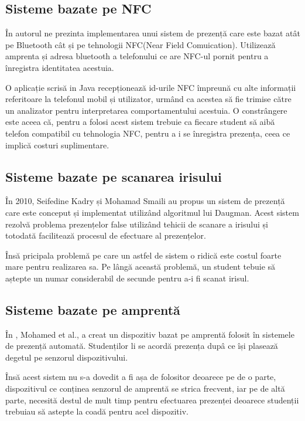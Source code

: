 \documentclass[a4paper, 12pt]{article}
\begin{document}
	
	\subsection{Sisteme bazate pe NFC}
	\bigskip
	\quad\space În \textbf{\cite{ahmad2014touchin}} autorul ne prezinta implementarea unui sistem de prezență care este bazat atât pe Bluetooth cât și pe tehnologii NFC(Near Field Comuication). Utilizează amprenta și adresa bluetooth a telefonului ce are NFC-ul pornit pentru a înregistra identitatea acestuia.
	
	O aplicație scrisă in Java \textbf{\cite{joy2000java}}  recepționează id-urile NFC împreună cu alte informații referitoare la telefonul mobil și utilizator, urmând ca acestea să fie trimise către un analizator pentru interpretarea comportamentului acestuia.
	O constrângere este aceea că, pentru a folosi acest sistem trebuie ca fiecare student să aibă telefon compatibil cu tehnologia NFC, pentru a i se înregistra prezența, ceea ce implică costuri suplimentare.
	
	\subsection{Sisteme bazate pe scanarea irisului}
	\bigskip
	\quad\space În 2010, Seifedine Kadry și Mohamad Smaili au propus un sistem de prezență care este conceput și implementat utilizând algoritmul lui Daugman. Acest sistem rezolvă problema prezențelor false utilizând tehicii de scanare a irisului și totodată facilitează procesul de efectuare al prezențelor. \textbf{\cite{kadry2013wireless}}
	
	Însă pricipala problemă pe care un astfel de sistem o ridică este costul foarte mare pentru realizarea sa. Pe lângă această problemă, un student tebuie să aștepte un numar considerabil de secunde pentru a-i fi scanat irisul. \textbf{\cite{kadry2013wireless}}
	
	
	\subsection{Sisteme bazate pe amprentă}
	\bigskip
	\quad\space În \textbf{\cite{mohamed2012fingerprint}}, Mohamed et al., a creat un dispozitiv bazat pe amprentă folosit în sistemele de prezență automată. Studenților li se acordă prezența dupâ ce își plasează degetul pe senzorul dispozitivului.
	
	Însă acest sistem nu s-a dovedit a fi așa de folositor deoarece pe de o parte, dispozitivul ce conținea senzorul de amprentă se strica frecvent, iar pe de altă parte, necesită destul de mult timp pentru efectuarea prezenței deoarece studenții trebuiau să astepte la coadă pentru acel dispozitiv.
	
\end{document}
